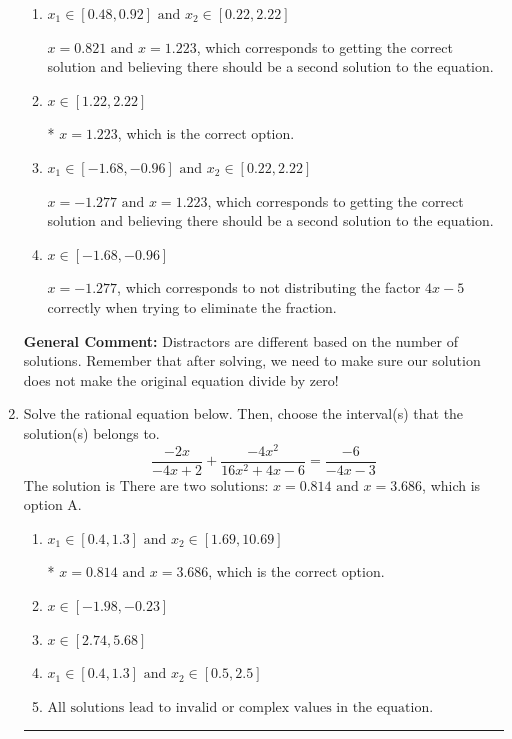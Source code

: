\documentclass{extbook}[14pt]
\newcommand{\litem}[1]{\item #1

\rule{\textwidth}{0.4pt}}
\begin{document}
\begin{enumerate}
{\begin{enumerate}[label=\Alph*.]
This corresponds to thinking $x = 1.223$ leads to dividing by zero in the original equation, which it does not.
\item \( x_1 \in [0.48, 0.92] \text{ and } x_2 \in [0.22,2.22] \)

$x = 0.821 \text{ and } x = 1.223$, which corresponds to getting the correct solution and believing there should be a second solution to the equation.
\item \( x \in [1.22,2.22] \)

* $x = 1.223$, which is the correct option.
\item \( x_1 \in [-1.68, -0.96] \text{ and } x_2 \in [0.22,2.22] \)

$x = -1.277 \text{ and } x = 1.223$, which corresponds to getting the correct solution and believing there should be a second solution to the equation.
\item \( x \in [-1.68,-0.96] \)

$x = -1.277$, which corresponds to not distributing the factor $4x -5$ correctly when trying to eliminate the fraction.
\end{enumerate}

\textbf{General Comment:} Distractors are different based on the number of solutions. Remember that after solving, we need to make sure our solution does not make the original equation divide by zero!
}
\litem{
Solve the rational equation below. Then, choose the interval(s) that the solution(s) belongs to.
\[ \frac{-2x}{-4x + 2} + \frac{-4x^{2}}{16x^{2} +4 x -6} = \frac{-6}{-4x -3} \]The solution is \( \text{There are two solutions: } x = 0.814 \text{ and } x = 3.686 \), which is option A.\begin{enumerate}[label=\Alph*.]
\item \( x_1 \in [0.4, 1.3] \text{ and } x_2 \in [1.69,10.69] \)

* $x = 0.814 \text{ and } x = 3.686$, which is the correct option.
\item \( x \in [-1.98,-0.23] \)


\item \( x \in [2.74,5.68] \)


\item \( x_1 \in [0.4, 1.3] \text{ and } x_2 \in [0.5,2.5] \)


\item \( \text{All solutions lead to invalid or complex values in the equation.} \)


\end{enumerate}

}
\end{enumerate}
\end{document}
